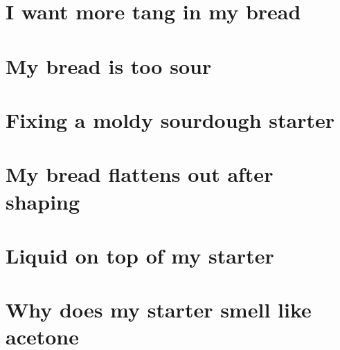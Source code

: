 \documentclass[a4paper, 12pt]{book}
\begin{document}
\section{I want more tang in my bread}
\section{My bread is too sour}
\section{Fixing a moldy sourdough starter}
\section{My bread flattens out after shaping}
\section{Liquid on top of my starter}
\section{Why does my starter smell like acetone}
\end{document}
